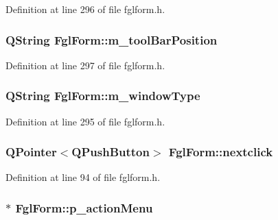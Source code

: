 Definition at line 296 of file fglform.h.

\hypertarget{classFglForm_a0008c6a1c3362095ebd5ab0601910003}{
\subsubsection[{m\_\-toolBarPosition}]{\setlength{\rightskip}{0pt plus 5cm}QString {\bf FglForm::m\_\-toolBarPosition}}}
\label{classFglForm_a0008c6a1c3362095ebd5ab0601910003}


Definition at line 297 of file fglform.h.

\hypertarget{classFglForm_aff3b675ee7063af63839e029f66b4075}{
\subsubsection[{m\_\-windowType}]{\setlength{\rightskip}{0pt plus 5cm}QString {\bf FglForm::m\_\-windowType}}}
\label{classFglForm_aff3b675ee7063af63839e029f66b4075}


Definition at line 295 of file fglform.h.

\hypertarget{classFglForm_a17945f68955698f41dac6b11cf73cd07}{
\subsubsection[{nextclick}]{\setlength{\rightskip}{0pt plus 5cm}QPointer$<$QPushButton$>$ {\bf FglForm::nextclick}}}
\label{classFglForm_a17945f68955698f41dac6b11cf73cd07}


Definition at line 94 of file fglform.h.

\hypertarget{classFglForm_aace1d4f7b637af4d3aa86e53a770152e}{
\subsubsection[{p\_\-actionMenu}]{$\ast$ {\bf FglForm::p\_\-actionMenu}}}
\label{classFglForm_aace1d4f7b637af4d3aa86e53a770152e}


